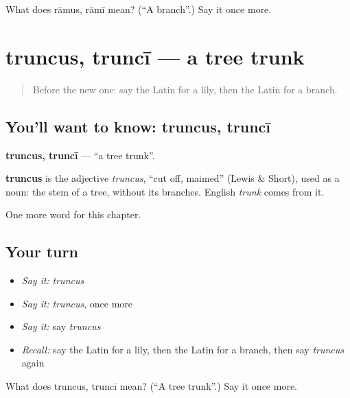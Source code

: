 \begin{tcolorbox}[breakable,colback=teal!4,colframe=teal!35!black,title={Before you move on}]
What does rāmus, rāmī mean? (\textquotedblleft{}A branch\textquotedblright{}.) Say it once more.
\end{tcolorbox}
\section[truncus, truncī]{truncus, truncī — a tree trunk}

\label{lesson:LA-C129-truncus}



\begin{quote}
Before the new one: say the Latin for a lily, then the Latin for a branch.
\end{quote}

\subsection*{You'll want to know: truncus, truncī}
\textbf{truncus, truncī} — \textquotedblleft{}a tree trunk\textquotedblright{}.

\begin{cousinweb}
\textbf{truncus} is the adjective \emph{truncus}, \textquotedblleft{}cut off, maimed\textquotedblright{} (Lewis \& Short), used as a noun: the stem of a tree, without its branches. English \emph{trunk} comes from it.
\end{cousinweb}

\begin{grammarlens}[title={What you've built}]
One more word for this chapter.
\end{grammarlens}

\subsection*{Your turn}
\begin{itemize}
\raggedright
  \item \emph{Say it:} \emph{truncus}
  \item \emph{Say it:} \emph{truncus}, once more
  \item \emph{Say it:} say \emph{truncus}
  \item \emph{Recall:} say the Latin for a lily, then the Latin for a branch, then say \emph{truncus} again
\end{itemize}

\begin{tcolorbox}[breakable,colback=teal!4,colframe=teal!35!black,title={Before you move on}]
What does truncus, truncī mean? (\textquotedblleft{}A tree trunk\textquotedblright{}.) Say it once more.
\end{tcolorbox}
